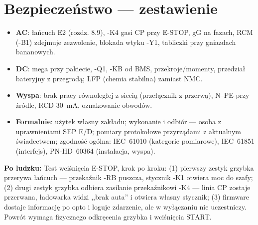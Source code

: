\documentclass[11pt,a4paper]{article}
\newcommand{\why}[1]{\par\smallskip\noindent\colorbox{blue!6}{\parbox{0.965\linewidth}{\small\textbf{Po ludzku:} #1}}\par\smallskip}
\begin{document}
\section{Bezpieczeństwo --- zestawienie}
\begin{itemize}
\item \textbf{AC}: łańcuch E2 (rozdz. 8.9), -K4 gasi CP przy E-STOP, gG na fazach, RCM (-B1)
zdejmuje zezwolenie, blokada wtyku -Y1, tabliczki przy gniazdach bananowych.
\item \textbf{DC}: mega przy pakiecie, -Q1, -KB od BMS, przekroje/momenty, przedział bateryjny
z przegrodą; LFP (chemia stabilna) zamiast NMC.
\item \textbf{Wyspa}: brak pracy równoległej z siecią (przełącznik z przerwą), N--PE przy źródle,
RCD 30~mA, oznakowanie obwodów.
\item \textbf{Formalnie}: użytek własny zakładu; wykonanie i odbiór --- osoba z uprawnieniami
SEP E/D; pomiary protokołowe przyrządami z aktualnym świadectwem; zgodność ogólna: IEC~61010
(kategorie pomiarowe), IEC~61851 (interfejs), PN-HD~60364 (instalacja, wyspa).
\end{itemize}
\why{Test wciśnięcia E-STOP, krok po kroku: (1) pierwszy zestyk grzybka przerywa łańcuch ---
przekaźnik -RB puszcza, stycznik -K1 otwiera moc do szafy; (2) drugi zestyk grzybka odbiera
zasilanie przekaźnikowi -K4 --- linia CP zostaje przerwana, ładowarka widzi ,,brak auta''
i otwiera własny stycznik; (3) firmware dostaje informację po opto i loguje zdarzenie, ale
w wyłączaniu nie uczestniczy. Powrót wymaga fizycznego odkręcenia grzybka i wciśnięcia START.}
\end{document}
